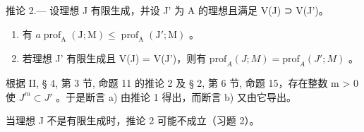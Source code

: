 推论 2.--- 设理想 J 有限生成，并设 J' 为 A 的理想且满足 V(J) ⊃ V(J')。

\begin{enumerate}
\def\labelenumi{\alph{enumi})}
\item
  有 \(a \operatorname{prof}_{\mathrm{A}}(\mathrm{J}; \mathrm{M}) \leqslant \operatorname{prof}_{\mathrm{A}}(\mathrm{J}'; \mathrm{M})\) 。
\item
  若理想 J' 有限生成且 V(J) = V(J')，则有 \(\text{prof}_{A}(J; M) = \text{prof}_{A}(J'; M)\) 。
\end{enumerate}

根据 II, § 4, 第 3 节, 命题 11 的推论 2 及 § 2, 第 6 节, 命题 15，存在整数 m \textgreater{} 0 使 \(J^{m} \subset J'\) 。于是断言 a) 由推论 1 得出，而断言 b) 又由它导出。

当理想 J 不是有限生成时，推论 2 可能不成立（习题 2）。

